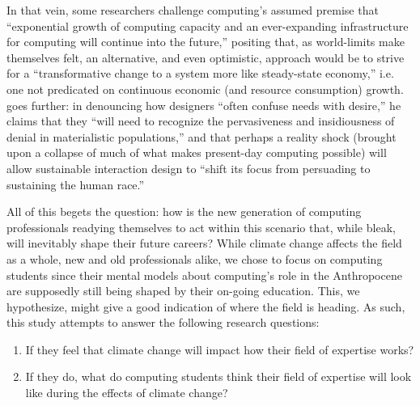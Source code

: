 In that vein, some researchers challenge computing's assumed premise that ``exponential growth of computing capacity and an ever-expanding infrastructure for computing will continue into the future,'' positing that, as world-limits make themselves felt, an alternative, and even optimistic, approach would be to strive for a ``transformative change to a system more like steady-state economy,'' i.e. one not predicated on continuous economic (and resource consumption) growth. \cite{nardiComputingLimits2018}
\citet{wong2009prepare} goes further: in denouncing how designers ``often confuse needs with desire,'' he claims that they ``will need to recognize the pervasiveness and insidiousness of denial in materialistic populations,'' and that perhaps a reality shock (brought upon a collapse of much of what makes present-day computing possible) will allow sustainable interaction design to ``shift its focus from persuading to sustaining the human race.''

All of this begets the question: how is the new generation of computing professionals readying themselves to act within this scenario that, while bleak, will inevitably shape their future careers? While climate change affects the field as a whole, new and old professionals alike, we chose to focus on computing students since their mental models about computing's role in the Anthropocene are supposedly still being shaped by their on-going education. This, we hypothesize, might give a good indication of where the field is heading. As such, this study attempts to answer the following research questions:

\begin{enumerate}
    \item If they feel that climate change will impact how their field of expertise works?
    \item If they do, what do computing students think their field of expertise will look like during the effects of climate change?
\end{enumerate}